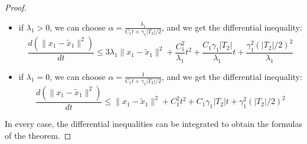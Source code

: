 \begin{proof}
\begin{itemize}
\item if $\lambda_1 >0$, we can choose $\alpha = \frac{ \lambda_1
  }{C_1 t + \gamma_1 |T_2|/2}$, and we get the differential
  inequality:
$$\frac{d (\| x_1 - \tilde x_1 \|^2)}{dt}  \leq 3\lambda_1 \|x_1 - \tilde x_1 \|^2  + \frac{C_1^2}{\lambda_1} t^2 + \frac{C_1 \gamma_1 |T_2|}{\lambda_1}t  + \frac{\gamma_1 ^2 (|T_2|/2)^2}{\lambda_1}$$
\item if $\lambda_1 =0$, we can choose $\alpha = \frac{ 1 }{C_1 t +
    \gamma_1 |T_2|/2}$, and we get the differential inequality:
$$\frac{d (\| x_1 - \tilde x_1 \|^2)}{dt}  \leq \|x_1 - \tilde x_1 \|^2  + {C_1^2} t^2 + {C_1 \gamma_1 |T_2|}t  + {\gamma_1 ^2 (|T_2|/2)^2}$$
\end{itemize}

In every case, the differential inequalities can be integrated to
obtain the formulas of the theorem.

 \end{proof}
%

